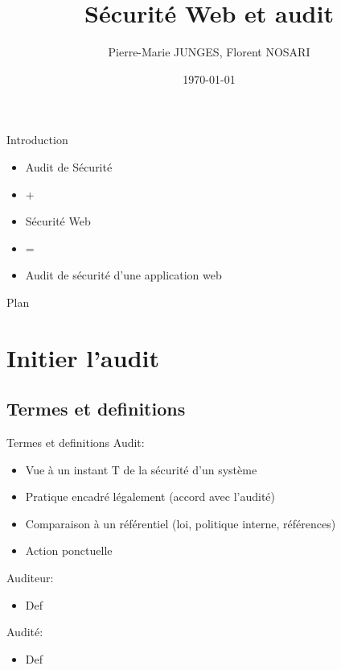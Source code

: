 \documentclass{beamer}
\title{Sécurité Web et audit}
\author{Pierre-Marie JUNGES, Florent NOSARI}
\institute[UL] {
		Université de Lorraine \\
	}
\date{\today}
\begin{document}
	
	  \begin{frame}
	  	\titlepage 
	  \end{frame}
	
	\begin{frame}{Introduction}
		\begin{itemize}
			\item Audit de Sécurité
			\item +
			\item Sécurité Web
			\item = 
			\item Audit de sécurité d'une application web
		\end{itemize}
	\end{frame}
	
	\begin{frame}{Plan}
		\tableofcontents
	\end{frame}
	
	
	\section{Initier l'audit}
	
		\subsection{Termes et definitions}
		\begin{frame}{Termes et definitions}
			Audit:
			\begin{itemize}
				\setlength{\itemindent}{+.2in}
				\item Vue à un instant T de la sécurité d'un système
				\item Pratique encadré légalement (accord avec l'audité)
				\item Comparaison à un référentiel (loi, politique interne, références)
				\item Action ponctuelle
			\end{itemize}
			Auditeur:
					\begin{itemize}
						\setlength{\itemindent}{+.2in}
				\item Def
			\end{itemize}
			Audité:
					\begin{itemize}
						\setlength{\itemindent}{+.2in}
				\item Def
			\end{itemize}
		\end{frame}
	
	
\end{document}
